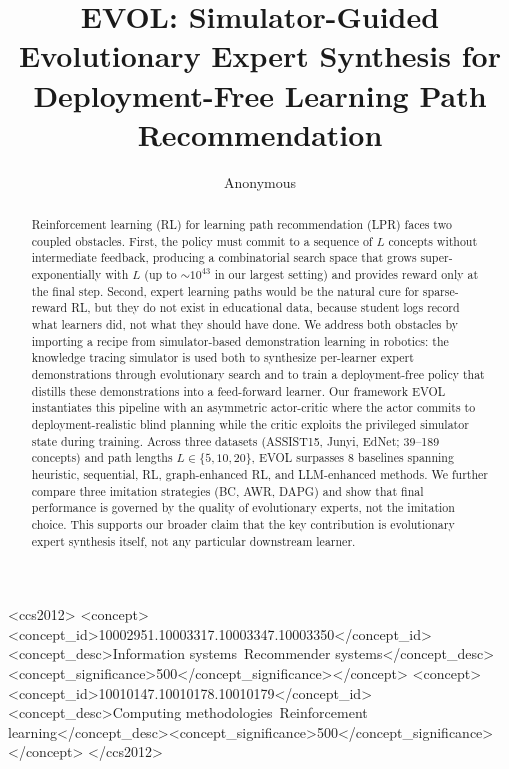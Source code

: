 \documentclass[sigconf,anonymous]{acmart}
\newcommand{\ours}{\textrm{EVOL}}
\begin{document}

\title{EVOL: Simulator-Guided Evolutionary Expert Synthesis for Deployment-Free Learning Path Recommendation}

\author{Anonymous}

\begin{abstract}
Reinforcement learning (RL) for learning path recommendation (LPR) faces two coupled obstacles. First, the policy must commit to a sequence of $L$ concepts without intermediate feedback, producing a combinatorial search space that grows super-exponentially with $L$ (up to $\sim\!10^{43}$ in our largest setting) and provides reward only at the final step. Second, expert learning paths would be the natural cure for sparse-reward RL, but they do not exist in educational data, because student logs record what learners did, not what they should have done. We address both obstacles by importing a recipe from simulator-based demonstration learning in robotics: the knowledge tracing simulator is used both to synthesize per-learner expert demonstrations through evolutionary search and to train a deployment-free policy that distills these demonstrations into a feed-forward learner. Our framework \ours{} instantiates this pipeline with an asymmetric actor-critic where the actor commits to deployment-realistic blind planning while the critic exploits the privileged simulator state during training. Across three datasets (ASSIST15, Junyi, EdNet; 39--189 concepts) and path lengths $L\in\{5,10,20\}$, \ours{} surpasses 8 baselines spanning heuristic, sequential, RL, graph-enhanced RL, and LLM-enhanced methods. We further compare three imitation strategies (BC, AWR, DAPG) and show that final performance is governed by the quality of evolutionary experts, not the imitation choice. This supports our broader claim that the key contribution is evolutionary expert synthesis itself, not any particular downstream learner.
\end{abstract}

\begin{CCSXML}
<ccs2012>
<concept><concept_id>10002951.10003317.10003347.10003350</concept_id><concept_desc>Information systems~Recommender systems</concept_desc><concept_significance>500</concept_significance></concept>
<concept><concept_id>10010147.10010178.10010179</concept_id><concept_desc>Computing methodologies~Reinforcement learning</concept_desc><concept_significance>500</concept_significance></concept>
</ccs2012>
\end{CCSXML}
\end{document}
